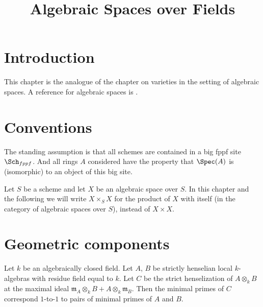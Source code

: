 

%


\title{Algebraic Spaces over Fields}


\maketitle

\label{section-phantom}

\tableofcontents

\section{Introduction}
\label{section-introduction}

\noindent
This chapter is the analogue of the chapter on varieties in the setting
of algebraic spaces. A reference for algebraic spaces is
\cite{Kn}.


\section{Conventions}
\label{section-conventions}

\noindent
The standing assumption is that all schemes are contained in
a big fppf site $\Sch_{fppf}$. And all rings $A$ considered
have the property that $\Spec(A)$ is (isomorphic) to an
object of this big site.

\medskip\noindent
Let $S$ be a scheme and let $X$ be an algebraic space over $S$.
In this chapter and the following we will write $X \times_S X$
for the product of $X$ with itself (in the category of algebraic
spaces over $S$), instead of $X \times X$.




\section{Geometric components}
\label{section-geometric-components}


\begin{lemma}
\label{lemma-minimal-primes-tensor-strictly-henselian}
Let $k$ be an algebraically closed field. Let $A$, $B$ be strictly
henselian local $k$-algebras with residue field equal to $k$.
Let $C$ be the strict henselization of $A \otimes_k B$ at the maximal
ideal $\mathfrak m_A \otimes_k B + A \otimes_k \mathfrak m_B$.
Then the minimal primes of $C$ correspond $1$-to-$1$ to pairs of
minimal primes of $A$ and $B$.
\end{lemma}

